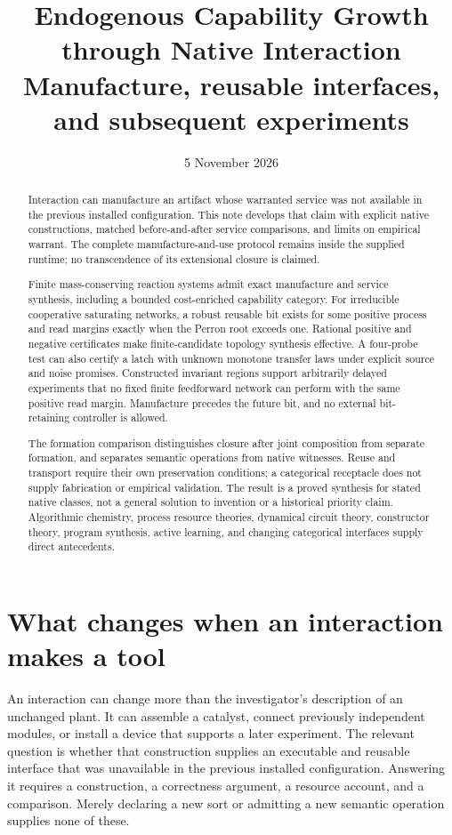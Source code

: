 \documentclass[11pt]{article}
\title{Endogenous Capability Growth through Native Interaction\\
\large Manufacture, reusable interfaces, and subsequent experiments}
\author{}
\date{5 November 2026}
\theoremstyle{definition}
\theoremstyle{remark}
\begin{document}
\maketitle
\begin{abstract}
Interaction can manufacture an artifact whose warranted service was not
available in the previous installed configuration. This note develops
that claim with explicit native constructions, matched before-and-after
service comparisons, and limits on empirical warrant. The complete
manufacture-and-use protocol remains inside the supplied runtime; no
transcendence of its extensional closure is claimed.

Finite mass-conserving reaction systems admit exact manufacture and
service synthesis, including a bounded cost-enriched capability category.
For irreducible cooperative saturating networks, a robust reusable bit
exists for some positive process and read margins exactly when the Perron
root exceeds one. Rational positive and negative certificates make
finite-candidate topology synthesis effective. A four-probe test can also
certify a latch with unknown monotone transfer laws under explicit source
and noise promises. Constructed invariant regions support arbitrarily
delayed experiments that no fixed finite feedforward network can perform
with the same positive read margin. Manufacture precedes the future bit,
and no external bit-retaining controller is allowed.

The formation comparison distinguishes closure after joint composition
from separate formation, and separates semantic operations from native
witnesses. Reuse and transport require their own preservation conditions;
a categorical receptacle does not supply fabrication or empirical
validation. The result is a proved synthesis for stated native classes,
not a general solution to invention or a historical priority claim.
Algorithmic chemistry, process resource theories, dynamical circuit
theory, constructor theory, program synthesis, active learning, and
changing categorical interfaces supply direct antecedents.
\end{abstract}
\tableofcontents


\section{What changes when an interaction makes a tool}\label{sec:question}
An interaction can change more than the investigator's description of an
unchanged plant. It can assemble a catalyst, connect previously independent
modules, or install a device that supports a later experiment. The relevant
question is whether that construction supplies an executable and reusable
interface that was unavailable in the previous installed configuration.
Answering it requires a construction, a correctness argument, a resource
account, and a comparison. Merely declaring a new sort or admitting a new
semantic operation supplies none of these.
\end{document}
